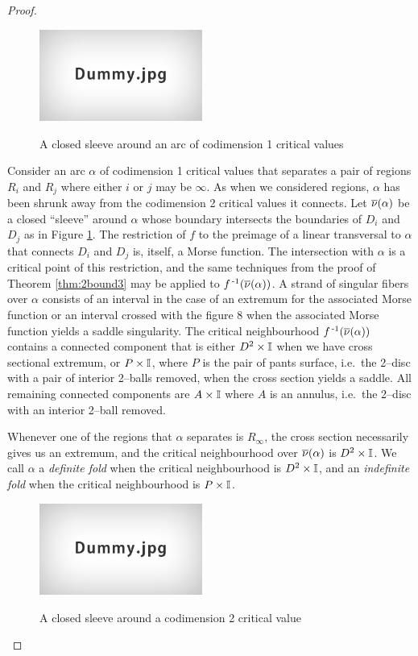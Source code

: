 \begin{proof}
	\begin{figure}
		\centering
		\caption{A closed sleeve around an arc of codimension 1 critical values}
		\includegraphics[height=3cm]{figures/dummy.jpg}
		\label{fig:arcsleeve}
	\end{figure}
	
	Consider an arc $\alpha$ of codimension 1 critical values that separates a pair of regions $R_i$ and $R_j$ where either $i$ or $j$ may be $\infty$.
	As when we considered regions, $\alpha$ has been shrunk away from the codimension 2 critical values it connects.
	Let $\overline{\nu}(\alpha)$ be a closed ``sleeve'' around $\alpha$ whose boundary intersects the boundaries of $D_i$ and $D_j$ as in Figure \ref{fig:arcsleeve}.
	The restriction of $f$ to the preimage of a linear transversal to $\alpha$ that connects $D_i$ and $D_j$ is, itself, a Morse function.
	The intersection with $\alpha$ is a critical point of this restriction, and the same techniques from the proof of Theorem \ref{thm:2bound3} may be applied to $f^{\,\text{-}1}(\overline{\nu}(\alpha))$.
	A strand of singular fibers over $\alpha$ consists of an interval in the case of an extremum for the associated Morse function or an interval crossed with the figure 8 when the associated Morse function yields a saddle singularity.
	The critical neighbourhood $f^{\,\text{-}1}(\overline{\nu}(\alpha))$ contains a connected component that is either $D^2\times\mathbb{I}$ when we have cross sectional extremum, or $P\times\mathbb{I}$, where $P$ is the pair of pants surface, i.e.\ the 2--disc with a pair of interior 2--balls removed, when the cross section yields a saddle.
	All remaining connected components are $A\times\mathbb{I}$ where $A$ is an annulus, i.e.\ the 2--disc with an interior 2--ball removed.
	
	Whenever one of the regions that $\alpha$ separates is $R_\infty$, the cross section necessarily gives us an extremum, and the critical neighbourhood over $\overline{\nu}(\alpha)$ is $D^2\times\mathbb{I}$.
	We call $\alpha$ a \emph{definite fold} when the critical neighbourhood is $D^2\times\mathbb{I}$, and an \emph{indefinite fold} when the critical neighbourhood is $P\times\mathbb{I}$.
	
	\begin{figure}
		\centering
		\caption{A closed sleeve around a codimension 2 critical value}
		\includegraphics[height=3cm]{figures/dummy.jpg}
		\label{fig:isolatesleeve}
	\end{figure}
	

\end{proof}

